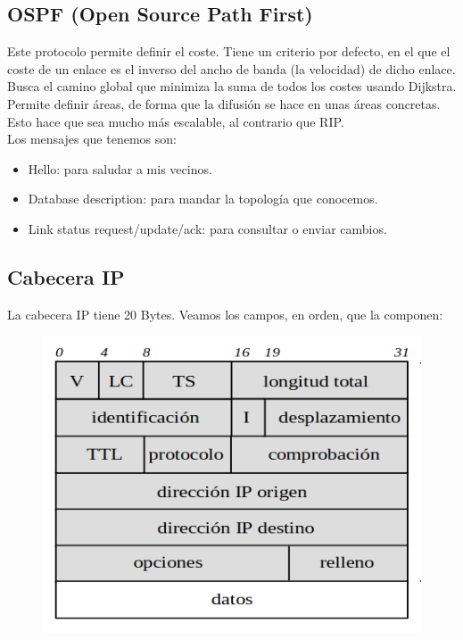 \subsection{OSPF (Open Source Path First)}

Este protocolo permite definir el coste. Tiene un criterio por defecto, en el que el coste de un enlace es el inverso del ancho de banda (la velocidad) de dicho enlace. Busca el camino global que minimiza la suma de todos los costes usando Dijkstra. \\

Permite definir áreas, de forma que la difusión se hace en unas áreas concretas. Esto hace que sea mucho más escalable, al contrario que RIP.\\

\noindent
Los mensajes que tenemos son:

\begin{itemize}
    \item Hello: para saludar a mis vecinos.
    \item Database description: para mandar la topología que conocemos. 
    \item Link status request/update/ack: para consultar o enviar cambios.
\end{itemize}


\subsection{Cabecera IP}
La cabecera IP tiene 20 Bytes. Veamos los campos, en orden, que la componen:
\begin{figure}[H]
    \centering
    \includegraphics[width=0.4\linewidth]{./images/cabecera-ip.png}
\end{figure}

